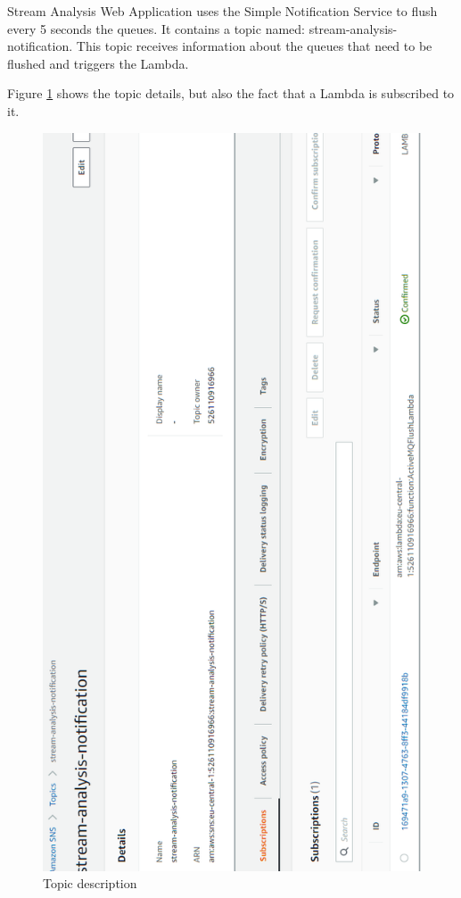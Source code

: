 Stream Analysis Web Application uses the Simple Notification Service to flush every 5 seconds the queues. It contains a topic named: stream-analysis-notification. This topic receives information about the queues that need to be flushed and triggers the Lambda.

Figure \ref{fig:sns} shows the topic details, but also the fact that a Lambda is subscribed to it.

\begin{figure}[p]
	\centering
	\noindent
	\includegraphics[width=0.5\paperwidth]{./images/aws_resources/SNS.PNG}
	\caption{Topic description}
	\label{fig:sns}
\end{figure}

